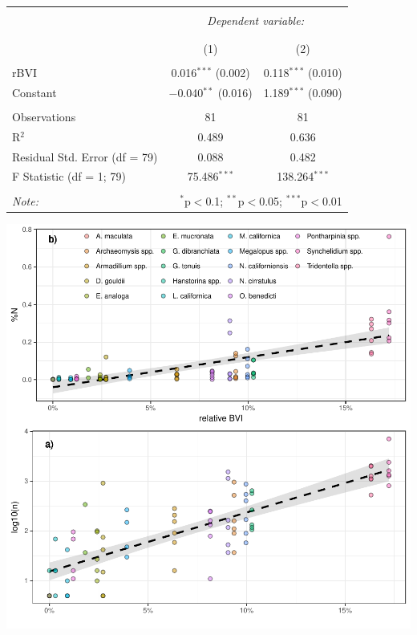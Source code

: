 \documentclass[12pt,]{article}
\begin{document}
\begin{table}[!htbp] \centering 
  \caption{} 
  \label{} 
\begin{tabular}{@{\extracolsep{5pt}}lcc} 
\\[-1.8ex]\hline 
\hline \\[-1.8ex] 
 & \multicolumn{2}{c}{\textit{Dependent variable:}} \\ 
\cline{2-3} 
\\[-1.8ex] & %
\\[-1.8ex] & (1) & (2)\\ 
\hline \\[-1.8ex] 
 rBVI & 0.016$^{***}$ (0.002) & 0.118$^{***}$ (0.010) \\ 
  Constant & $-$0.040$^{**}$ (0.016) & 1.189$^{***}$ (0.090) \\ 
 \hline \\[-1.8ex] 
Observations & 81 & 81 \\ 
R$^{2}$ & 0.489 & 0.636 \\ 
Residual Std. Error (df = 79) & 0.088 & 0.482 \\ 
F Statistic (df = 1; 79) & 75.486$^{***}$ & 138.264$^{***}$ \\ 
\hline 
\hline \\[-1.8ex] 
\textit{Note:}  & \multicolumn{2}{r}{$^{*}$p$<$0.1; $^{**}$p$<$0.05; $^{***}$p$<$0.01} \\ 
\end{tabular} 
\end{table}

\clearpage

\includegraphics{BVI_Manuscript_files/figure-latex/unnamed-chunk-7-1.pdf}
\end{document}
